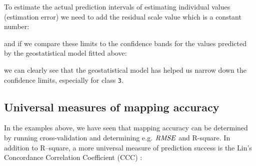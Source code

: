 \documentclass[11pt]{krantz}
\newenvironment{Shaded}{\begin{snugshade}}{\end{snugshade}}
\newcommand{\CommentTok}[1]{\textcolor[rgb]{0.37,0.37,0.37}{\textit{#1}}}
\newcommand{\DataTypeTok}[1]{\textcolor[rgb]{0.27,0.27,0.27}{#1}}
\newcommand{\DecValTok}[1]{\textcolor[rgb]{0.06,0.06,0.06}{#1}}
\newcommand{\KeywordTok}[1]{\textcolor[rgb]{0.27,0.27,0.27}{\textbf{#1}}}
\newcommand{\NormalTok}[1]{#1}
\newcommand{\OperatorTok}[1]{\textcolor[rgb]{0.43,0.43,0.43}{\textbf{#1}}}
\newcommand{\OtherTok}[1]{\textcolor[rgb]{0.37,0.37,0.37}{#1}}
\theoremstyle{definition}
\theoremstyle{definition}
\theoremstyle{definition}
\theoremstyle{remark}
\begin{document}
To estimate the actual prediction intervals of estimating individual
values (estimation error) we need to add the residual scale value which
is a constant number:

\begin{Shaded}
\end{Shaded}

and if we compare these limits to the confidence bands for the values
predicted by the geostatistical model fitted above:

\begin{Shaded}
\end{Shaded}

we can clearly see that the geostatistical model has helped us narrow
down the confidence limits, especially for class \texttt{3}.

\hypertarget{universal-measures-of-mapping-accuracy}{%
\subsection{Universal measures of mapping
accuracy}\label{universal-measures-of-mapping-accuracy}}

In the examples above, we have seen that mapping accuracy can be
determined by running cross-validation and determining e.g.
\(\it{RMSE}\) and R-square. In addition to R--square, a more universal
measure of prediction success is the Lin's Concordance Correlation
Coefficient (CCC) \citep{steichen2002note}:
\end{document}
